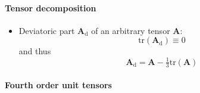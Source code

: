 \documentclass{goose-article}
\begin{document}
\paragraph{Tensor decomposition}
\vspace*{.5eM}

\begin{itemize}
%
\item Deviatoric part $\bm{A}_\mathrm{d}$ of an arbitrary tensor $\bm{A}$:
\begin{equation}
  \mathrm{tr}\left( \bm{A}_\mathrm{d} \right) \equiv 0
\end{equation}
and thus
\begin{equation}
  \bm{A}_\mathrm{d} = \bm{A} - \tfrac{1}{3} \mathrm{tr}\left( \bm{A} \right)
\end{equation}
%
\end{itemize}

\paragraph{Fourth order unit tensors}
\vspace*{.5eM}
\end{document}
